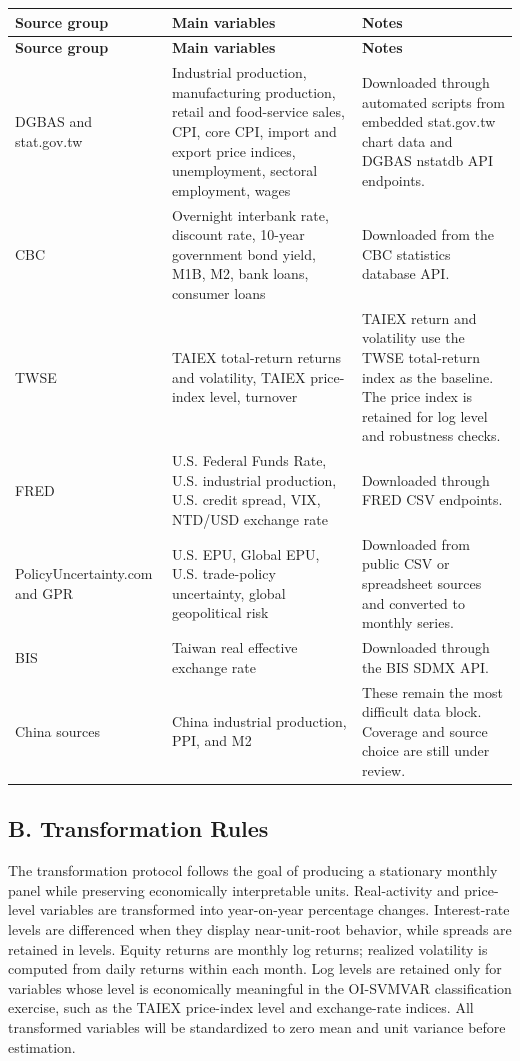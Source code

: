 \begin{center}
\small
\setlength{\tabcolsep}{5pt}
\renewcommand{\arraystretch}{1.1}
\begin{longtable}{p{3.2cm} p{5.2cm} p{6.2cm}}
\hline
\textbf{Source group} & \textbf{Main variables} & \textbf{Notes} \\
\hline
\endfirsthead
\hline
\textbf{Source group} & \textbf{Main variables} & \textbf{Notes} \\
\hline
\endhead
\hline
\endfoot
DGBAS and stat.gov.tw & Industrial production, manufacturing production, retail and food-service sales, CPI, core CPI, import and export price indices, unemployment, sectoral employment, wages & Downloaded through automated scripts from embedded stat.gov.tw chart data and DGBAS nstatdb API endpoints. \\
CBC & Overnight interbank rate, discount rate, 10-year government bond yield, M1B, M2, bank loans, consumer loans & Downloaded from the CBC statistics database API. \\
TWSE & TAIEX total-return returns and volatility, TAIEX price-index level, turnover & TAIEX return and volatility use the TWSE total-return index as the baseline. The price index is retained for log level and robustness checks. \\
FRED & U.S. Federal Funds Rate, U.S. industrial production, U.S. credit spread, VIX, NTD/USD exchange rate & Downloaded through FRED CSV endpoints. \\
PolicyUncertainty.com and GPR & U.S. EPU, Global EPU, U.S. trade-policy uncertainty, global geopolitical risk & Downloaded from public CSV or spreadsheet sources and converted to monthly series. \\
BIS & Taiwan real effective exchange rate & Downloaded through the BIS SDMX API. \\
China sources & China industrial production, PPI, and M2 & These remain the most difficult data block. Coverage and source choice are still under review. \\
\end{longtable}
\end{center}

\subsection*{B. Transformation Rules}

\noindent The transformation protocol follows the goal of producing a stationary monthly panel while preserving economically interpretable units. Real-activity and price-level variables are transformed into year-on-year percentage changes. Interest-rate levels are differenced when they display near-unit-root behavior, while spreads are retained in levels. Equity returns are monthly log returns; realized volatility is computed from daily returns within each month. Log levels are retained only for variables whose level is economically meaningful in the OI-SVMVAR classification exercise, such as the TAIEX price-index level and exchange-rate indices. All transformed variables will be standardized to zero mean and unit variance before estimation.

